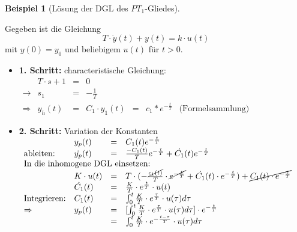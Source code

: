 \documentclass[12pt,a4paper,ngerman]{scrartcl}
\newtheorem{bsp}{Beispiel}[section] %
\begin{document}
  \begin{bsp}[Lösung der DGL des $PT_1$-Gliedes]
\end{bsp}
Gegeben ist die Gleichung
\begin{equation*}
  T\cdot \dot{y}(t)+y(t)=k\cdot u(t)
\end{equation*}
mit $y(0)=y_0$ und beliebigem $u(t)$ für $t>0$.
\begin{itemize}
\item \textbf{1. Schritt:} characteristische Gleichung:\\
  \begin{math}
    \begin{array}{llllllll}
      &T\cdot s +1&=&0\\
      \rightarrow&s_1&=&-\frac{1}{T}\\
      \Rightarrow&y_h(t)&=&C_1\cdot y_1(t)&=&c_1*e^{-\frac{t}{T}}&\text{(Formelsammlung)}
    \end{array}
  \end{math}
\item \textbf{2. Schritt:} Variation der Konstanten\\
  \begin{math}
    \begin{array}{lllllllll}
                       &y_p(t)&=&C_1(t)e^{-\frac{t}{T}}\\
      \text{ableiten: }&\dot{y_p}(t)&=&\frac{-C_1(t)}{T}e^{-\frac{t}{T}}+\dot{C_1}(t)e^{-\frac{t}{T}}\\
\multicolumn{4}{l}{\text{In die inhomogene DGL einsetzen:}}\\
&K\cdot u(t)&=&T\cdot (-\frac{\cancel{c_1(t)}}{T}\cdot \cancel{e^{-\frac{t}{T}}}+\dot{C_1}(t)\cdot e^{-\frac{t}{T}})+\cancel{C_1(t)\cdot e^{-\frac{t}{T}}}\\
&\dot{C_1}(t)&=&\frac{K}{T}\cdot e^{\frac{t}{T}}\cdot u(t)\\
\text{Integrieren:}&C_1(t)&=&\int_0^t{\frac{K}{T}\cdot e^{\frac{\tau}{T}}\cdot u(\tau)d\tau}\\
\Rightarrow&y_p(t)&=&[\int_0^t{\frac{K}{T}\cdot e^{\frac{\tau}{T}}\cdot u(\tau)d\tau}]\cdot e^{-\frac{t}{T}}\\
&&=&\int_0^t{\frac{K}{T}\cdot e^{-\frac{t-\tau}{T}}\cdot u(\tau)d\tau}


\end{array}
\end{math}
\end{itemize}
\end{document}

